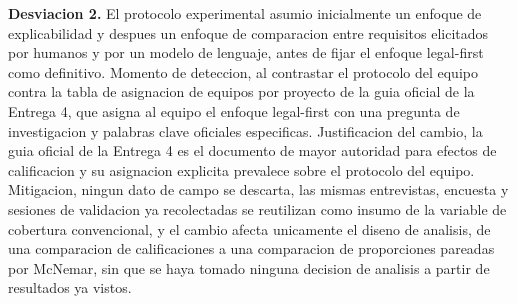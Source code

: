\documentclass[11pt,a4paper]{article}
\begin{document}
\textbf{Desviacion 2.} El protocolo experimental asumio inicialmente un enfoque de explicabilidad y despues un enfoque de comparacion entre requisitos elicitados por humanos y por un modelo de lenguaje, antes de fijar el enfoque legal-first como definitivo. Momento de deteccion, al contrastar el protocolo del equipo contra la tabla de asignacion de equipos por proyecto de la guia oficial de la Entrega 4, que asigna al equipo el enfoque legal-first con una pregunta de investigacion y palabras clave oficiales especificas. Justificacion del cambio, la guia oficial de la Entrega 4 es el documento de mayor autoridad para efectos de calificacion y su asignacion explicita prevalece sobre el protocolo del equipo. Mitigacion, ningun dato de campo se descarta, las mismas entrevistas, encuesta y sesiones de validacion ya recolectadas se reutilizan como insumo de la variable de cobertura convencional, y el cambio afecta unicamente el diseno de analisis, de una comparacion de calificaciones a una comparacion de proporciones pareadas por McNemar, sin que se haya tomado ninguna decision de analisis a partir de resultados ya vistos.
\end{document}
